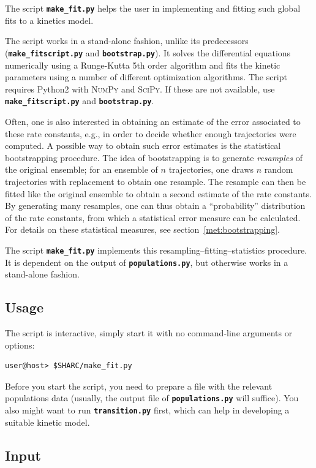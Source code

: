 \documentclass[a4paper,10pt,DIV=15,openany]{scrbook}
\newcommand{\ttt}[1]{\textbf{\texttt{#1}}}
\begin{document}
The script \ttt{make\_fit.py} helps the user in implementing and fitting such global fits to a kinetics model.

The script works in a stand-alone fashion, unlike its predecessors (\ttt{make\_fitscript.py} and \ttt{bootstrap.py}).
It solves the differential equations numerically using a Runge-Kutta 5th order algorithm and fits the kinetic parameters using a number of different optimization algorithms.
The script requires Python2 with \textsc{NumPy} and \textsc{SciPy}.
If these are not available, use \ttt{make\_fitscript.py} and \ttt{bootstrap.py}.

Often, one is also interested in obtaining an estimate of the error associated to these rate constants, e.g., in order to decide whether enough trajectories were computed.
A possible way to obtain such error estimates is the statistical bootstrapping procedure.
The idea of bootstrapping is to generate \emph{resamples} of the original ensemble; for an ensemble of $n$ trajectories, one draws $n$ random trajectories with replacement to obtain one resample.
The resample can then be fitted like the original ensemble to obtain a second estimate of the rate constants. 
By generating many resamples, one can thus obtain a ``probability'' distribution of the rate constants, from which a statistical error measure can be calculated.
For details on these statistical measures, see section~\ref{met:bootstrapping}.

The script \ttt{make\_fit.py} implements this resampling--fitting--statistics procedure.
It is dependent on the output of \ttt{populations.py}, but otherwise works in a stand-alone fashion.



\subsection{Usage}

The script is interactive, simply start it with no command-line arguments or options:
\begin{verbatim}
user@host> $SHARC/make_fit.py
\end{verbatim}

Before you start the script, you need to prepare a file with the relevant populations data (usually, the output file of \ttt{populations.py} will suffice).
You also might want to run \ttt{transition.py} first, which can help in developing a suitable kinetic model.

\subsection{Input}
\end{document}
